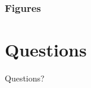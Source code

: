 \documentclass[11pt]{beamer}
\begin{document}
\begin{frame}
  \frametitle{Figures}
  \begin{minipage}{.45\linewidth}
    \begin{center}
      
    \end{center}
  \end{minipage}
  \begin{minipage}{.45\linewidth}
    \begin{center}
      
    \end{center}
  \end{minipage}

\end{frame}

\section{Questions}
\begin{frame}{}
  \vfill
  \begin{center}
    Questions?
  \end{center}
  \vfill
  
\end{frame}
\end{document}
